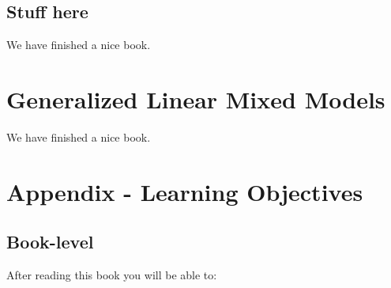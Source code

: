 \documentclass[]{book}
\theoremstyle{definition}
\theoremstyle{definition}
\theoremstyle{definition}
\theoremstyle{remark}
\begin{document}
\section{Stuff here}\label{stuff-here}

We have finished a nice book.

\chapter{Generalized Linear Mixed Models}\label{glmm}

We have finished a nice book.

\chapter{Appendix - Learning Objectives}\label{learningobj}

\section{Book-level}\label{book-level}

After reading this book you will be able to:
\end{document}
